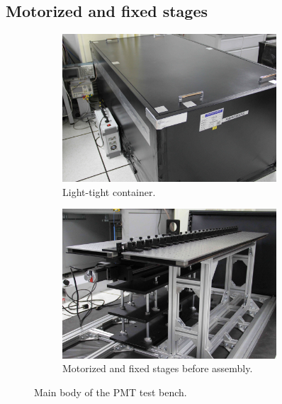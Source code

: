 \documentclass{nst}
\begin{document}
\subsection{Motorized and fixed stages}
\label{sec:stages}

\begin{figure}[!htb]
	\begin{subfigure}[t]{80mm}
		\includegraphics[width=80mm]{FIG2_a}
		\caption{Light-tight container.}
		\label{fig:FIG2_a}
	\end{subfigure}
	\begin{subfigure}[t]{80mm}
		\includegraphics[width=80mm]{FIG2_b}
		\caption{Motorized and fixed stages before assembly.}
		\label{fig:FIG2_b}
	\end{subfigure}
	\caption{Main body of the PMT test bench.}
	\label{fig:FIG2}
\end{figure}
\end{document}
